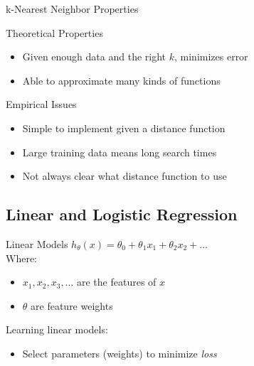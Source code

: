 \documentclass[14pt]{beamer}
\begin{document}
\begin{frame}[label=knn-properties]{k-Nearest Neighbor Properties}
\begin{block}{Theoretical Properties}
\begin{itemize}
\item Given enough data and the right $k$, minimizes error
\item Able to approximate many kinds of functions
\end{itemize}
\end{block}
\begin{block}{Empirical Issues}
\begin{itemize}
\item Simple to implement given a distance function
\item Large training data means long search times
\item Not always clear what distance function to use
\end{itemize}
\end{block}
\end{frame}

\subsection{Linear and Logistic Regression}

\begin{frame}[label=linear-models]{Linear Models}{}
{\Large$h_{\theta}(x) = \theta_0 + \theta_1 x_1 + \theta_2 x_2 + \ldots$}\\[1em]
Where:
\begin{itemize}
\item $x_1, x_2, x_3, \ldots$ are the features of $x$
\item $\theta$ are feature weights
\end{itemize}
\pause
\bigskip
Learning linear models:
\begin{itemize}
\item Select parameters (weights) to minimize \emph{loss}
\end{itemize}
\end{frame}
\end{document}
